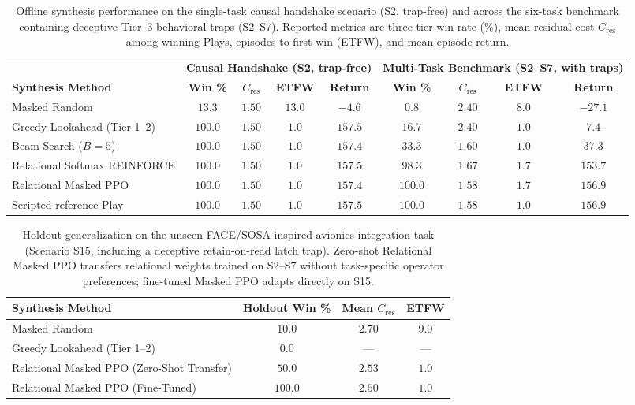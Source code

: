 \begin{table}[t]
\centering
\caption{Offline synthesis performance on the single-task causal handshake scenario (S2, trap-free) and across the six-task benchmark containing deceptive Tier~3 behavioral traps (S2--S7). Reported metrics are three-tier win rate (\%), mean residual cost $C_{\mathrm{res}}$ among winning Plays, episodes-to-first-win (ETFW), and mean episode return.}
\label{tab:offline-rl}
\footnotesize
\begin{tabular}{@{}lcccccccc@{}}
\toprule
 & \multicolumn{4}{c}{\textbf{Causal Handshake (S2, trap-free)}} & \multicolumn{4}{c}{\textbf{Multi-Task Benchmark (S2--S7, with traps)}} \\
\cmidrule(lr){2-5} \cmidrule(l){6-9}
\textbf{Synthesis Method} & \textbf{Win \%} & \textbf{$C_{\mathrm{res}}$} & \textbf{ETFW} & \textbf{Return} & \textbf{Win \%} & \textbf{$C_{\mathrm{res}}$} & \textbf{ETFW} & \textbf{Return} \\
\midrule
Masked Random & $13.3$ & $1.50$ & $13.0$ & $-4.6$ & $0.8$ & $2.40$ & $8.0$ & $-27.1$ \\
Greedy Lookahead (Tier 1--2) & $100.0$ & $1.50$ & $1.0$ & $157.5$ & $16.7$ & $2.40$ & $1.0$ & $7.4$ \\
Beam Search ($B=5$) & $100.0$ & $1.50$ & $1.0$ & $157.4$ & $33.3$ & $1.60$ & $1.0$ & $37.3$ \\
Relational Softmax REINFORCE & $100.0$ & $1.50$ & $1.0$ & $157.5$ & $98.3$ & $1.67$ & $1.7$ & $153.7$ \\
Relational Masked PPO & $100.0$ & $1.50$ & $1.0$ & $157.4$ & $100.0$ & $1.58$ & $1.7$ & $156.9$ \\
Scripted reference Play & $100.0$ & $1.50$ & $1.0$ & $157.5$ & $100.0$ & $1.58$ & $1.0$ & $156.9$ \\
\bottomrule
\end{tabular}
\end{table}

\begin{table}[t]
\centering
\caption{Holdout generalization on the unseen FACE/SOSA-inspired avionics integration task (Scenario S15, including a deceptive retain-on-read latch trap). Zero-shot Relational Masked PPO transfers relational weights trained on S2--S7 without task-specific operator preferences; fine-tuned Masked PPO adapts directly on S15.}
\label{tab:offline-holdout}
\footnotesize
\begin{tabular}{@{}lccc@{}}
\toprule
\textbf{Synthesis Method} & \textbf{Holdout Win \%} & \textbf{Mean $C_{\mathrm{res}}$} & \textbf{ETFW} \\
\midrule
Masked Random & $10.0$ & $2.70$ & $9.0$ \\
Greedy Lookahead (Tier 1--2) & $0.0$ & --- & --- \\
Relational Masked PPO (Zero-Shot Transfer) & $50.0$ & $2.53$ & $1.0$ \\
Relational Masked PPO (Fine-Tuned) & $100.0$ & $2.50$ & $1.0$ \\
\bottomrule
\end{tabular}
\end{table}

